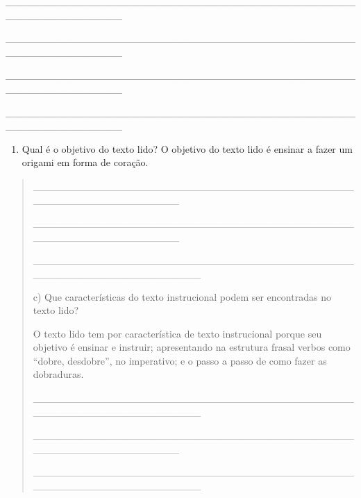 \begin{itemize}
{{{\begin{itemize}
\_\_\_\_\_\_\_\_\_\_\_\_\_\_\_\_\_\_\_\_\_\_\_\_\_\_\_\_\_\_\_\_\_\_\_\_\_\_\_\_\_\_\_\_\_\_\_\_\_\_\_\_\_\_\_\_\_\_\_\_\_\_\_\_

\_\_\_\_\_\_\_\_\_\_\_\_\_\_\_\_\_\_\_\_\_\_\_\_\_\_\_\_\_\_\_\_\_\_\_\_\_\_\_\_\_\_\_\_\_\_\_\_\_\_\_\_\_\_\_\_\_\_\_\_\_\_\_\_

\_\_\_\_\_\_\_\_\_\_\_\_\_\_\_\_\_\_\_\_\_\_\_\_\_\_\_\_\_\_\_\_\_\_\_\_\_\_\_\_\_\_\_\_\_\_\_\_\_\_\_\_\_\_\_\_\_\_\_\_\_\_\_\_

\_\_\_\_\_\_\_\_\_\_\_\_\_\_\_\_\_\_\_\_\_\_\_\_\_\_\_\_\_\_\_\_\_\_\_\_\_\_\_\_\_\_\_\_\_\_\_\_\_\_\_\_\_\_\_\_\_\_\_\_\_\_\_\_

\begin{enumerate}
\def\labelenumi{\alph{enumi})}
\item
  Qual é o objetivo do texto lido? O objetivo do texto lido é ensinar a
  fazer um origami em forma de coração.
\end{enumerate}

\begin{quote}
\_\_\_\_\_\_\_\_\_\_\_\_\_\_\_\_\_\_\_\_\_\_\_\_\_\_\_\_\_\_\_\_\_\_\_\_\_\_\_\_\_\_\_\_\_\_\_\_\_\_\_\_\_\_\_\_\_\_\_\_\_\_\_\_

\_\_\_\_\_\_\_\_\_\_\_\_\_\_\_\_\_\_\_\_\_\_\_\_\_\_\_\_\_\_\_\_\_\_\_\_\_\_\_\_\_\_\_\_\_\_\_\_\_\_\_\_\_\_\_\_\_\_\_\_\_\_\_\_

\protect\hypertarget{_Hlk127463829}{}{}\_\_\_\_\_\_\_\_\_\_\_\_\_\_\_\_\_\_\_\_\_\_\_\_\_\_\_\_\_\_\_\_\_\_\_\_\_\_\_\_\_\_\_\_\_\_\_\_\_\_\_\_\_\_\_\_\_\_\_\_\_\_\_\_\_\_\_

c) Que características do texto instrucional podem ser encontradas no
texto lido?

O texto lido tem por característica de texto instrucional porque seu
objetivo é ensinar e instruir; apresentando na estrutura frasal verbos
como ``dobre, desdobre'', no imperativo; e o passo a passo de como fazer
as dobraduras.

\_\_\_\_\_\_\_\_\_\_\_\_\_\_\_\_\_\_\_\_\_\_\_\_\_\_\_\_\_\_\_\_\_\_\_\_\_\_\_\_\_\_\_\_\_\_\_\_\_\_\_\_\_\_\_\_\_\_\_\_\_\_\_\_\_\_\_

\_\_\_\_\_\_\_\_\_\_\_\_\_\_\_\_\_\_\_\_\_\_\_\_\_\_\_\_\_\_\_\_\_\_\_\_\_\_\_\_\_\_\_\_\_\_\_\_\_\_\_\_\_\_\_\_\_\_\_\_\_\_\_\_

\_\_\_\_\_\_\_\_\_\_\_\_\_\_\_\_\_\_\_\_\_\_\_\_\_\_\_\_\_\_\_\_\_\_\_\_\_\_\_\_\_\_\_\_\_\_\_\_\_\_\_\_\_\_\_\_\_\_\_\_\_\_\_\_\_\_\_
\end{quote}



\end{itemize}}}}
\end{itemize}
